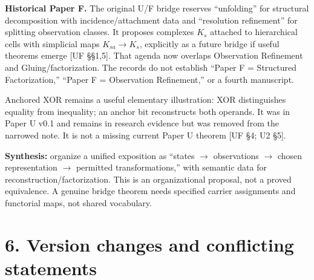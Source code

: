 \documentclass[10pt,letterpaper]{article}
\begin{document}
\textbf{Historical Paper F.} The original U/F bridge reserves ``unfolding'' for structural decomposition with incidence/attachment data and ``resolution refinement'' for splitting observation classes. It proposes complexes \(K_s\) attached to hierarchical cells with simplicial maps \(K_{sa}\to K_s\), explicitly as a future bridge if useful theorems emerge [UF \S{}\S{}1,5]. That agenda now overlaps Observation Refinement and Gluing/factorization. The records do not establish ``Paper F = Structured Factorization,'' ``Paper F = Observation Refinement,'' or a fourth manuscript.\par

Anchored XOR remains a useful elementary illustration: XOR distinguishes equality from inequality; an anchor bit reconstructs both operands. It was in Paper U v0.1 and remains in research evidence but was removed from the narrowed note. It is not a missing current Paper U theorem [UF \S{}4; U2 \S{}5].\par

\textbf{Synthesis:} organize a unified exposition as ``states \ensuremath{\to} observations \ensuremath{\to} chosen representation \ensuremath{\to} permitted transformations,'' with semantic data for reconstruction/factorization. This is an organizational proposal, not a proved equivalence. A genuine bridge theorem needs specified carrier assignments and functorial maps, not shared vocabulary.\par

\section*{6. Version changes and conflicting statements}
\end{document}
